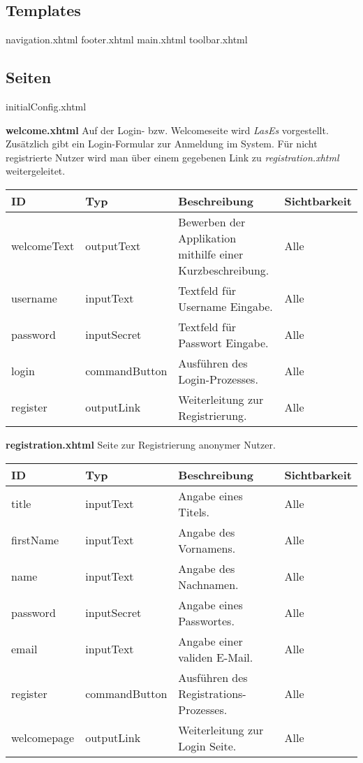 
\subsection{Templates}
navigation.xhtml
footer.xhtml
main.xhtml
toolbar.xhtml

\subsection{Seiten}
initialConfig.xhtml

\textbf{welcome.xhtml} Auf der Login- bzw. Welcomeseite wird \emph{LasEs} vorgestellt.
Zusätzlich gibt ein Login-Formular zur Anmeldung im System.
Für nicht registrierte Nutzer wird man über einem gegebenen Link zu \emph{registration.xhtml} weitergeleitet.


\begin{tabular}[H]{|m{2.5cm}|m{3cm}|m{6cm}|m{2.5cm}|}
    \hline
    \textbf{ID} & \textbf{Typ} & \textbf{Beschreibung} & \textbf{Sichtbarkeit} \\
    \hline
    \hline
    welcomeText & outputText & Bewerben der Applikation mithilfe einer Kurzbeschreibung. & Alle \\
    \hline
    username & inputText & Textfeld für Username Eingabe. & Alle \\
    \hline
    password & inputSecret & Textfeld für Passwort Eingabe. & Alle \\
    \hline
    login & commandButton & Ausführen des Login-Prozesses. & Alle \\
    \hline
    register & outputLink & Weiterleitung zur Registrierung. & Alle \\
    \hline
\end{tabular}

\textbf{registration.xhtml} Seite zur Registrierung anonymer Nutzer.

\begin{tabular}[H]{|m{2.5cm}|m{3cm}|m{6cm}|m{2.5cm}|}
    \hline
    \textbf{ID} & \textbf{Typ} & \textbf{Beschreibung} & \textbf{Sichtbarkeit} \\
    \hline
    \hline
    title & inputText & Angabe eines Titels. & Alle \\
    \hline
    firstName & inputText & Angabe des Vornamens. & Alle \\
    \hline
    name & inputText & Angabe des Nachnamen. & Alle \\
    \hline
    password & inputSecret & Angabe eines Passwortes. & Alle \\
    \hline
    email & inputText & Angabe einer validen E-Mail. & Alle \\
    \hline
    register & commandButton & Ausführen des Registrations-Prozesses. & Alle \\
    \hline
    welcomepage & outputLink & Weiterleitung zur Login Seite. & Alle\\
    \hline
\end{tabular}

